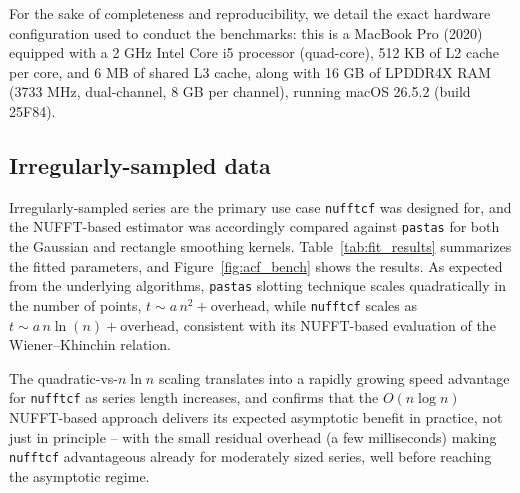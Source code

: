 \documentclass[twocolumn,10pt]{article}
\newcommand{\nufftcf}{\texttt{nufftcf}\xspace}
\newcommand{\pastas}{\texttt{pastas}\xspace}
\begin{document}
For the sake of completeness and reproducibility, we detail the exact hardware configuration used to conduct the benchmarks: this is a MacBook Pro (2020) equipped with a 2 GHz Intel Core i5 processor (quad-core), 512 KB of L2 cache per core, and 6 MB of shared L3 cache, along with 16 GB of LPDDR4X RAM (3733 MHz, dual-channel, 8 GB per channel), running macOS 26.5.2 (build 25F84).
%
\subsection{Irregularly-sampled data}
%
Irregularly-sampled series are the primary use case \nufftcf was
designed for, and the NUFFT-based estimator was accordingly compared
against \pastas for both the Gaussian and rectangle smoothing kernels.
 Table~\ref{tab:fit_results} summarizes the
 fitted parameters, and Figure~\ref{fig:acf_bench} shows the results.
 As expected from the underlying algorithms, \pastas slotting
technique scales quadratically in the number of points, $t \sim a\,n^2 +
\text{overhead}$, while \nufftcf scales as $t \sim a\,n\ln(n) +
\text{overhead}$, consistent with its NUFFT-based evaluation of the
Wiener--Khinchin relation. 

The quadratic-vs-$n\ln n$ scaling translates into a rapidly growing speed
advantage for \nufftcf as series length increases, and confirms that the
$O(n\log n)$ NUFFT-based approach delivers its expected asymptotic
benefit in practice, not just in principle -- with the small residual
overhead (a few milliseconds) making \nufftcf advantageous already for
moderately sized series, well before reaching the asymptotic regime.
\end{document}
